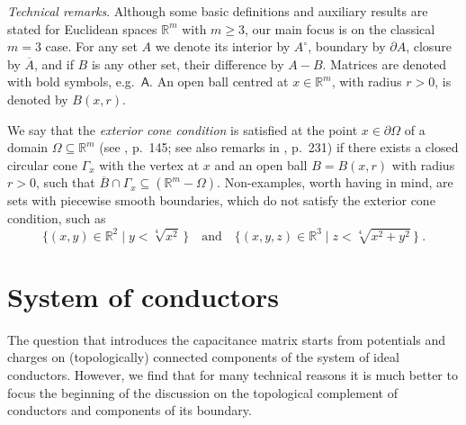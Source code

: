 \documentclass[12pt]{iopart}
\newcommand{\dd}{\partial}
\newcommand{\mx}[1]{\bm{\mathsf{#1}}}
\newcommand{\0}{\vct{0}}
\newcommand{\rr}{\mathds{R}}
\newcommand{\cl}[1]{\overline{#1}}
\theoremstyle{plain} \newtheorem{tm}{Theorem}[section]
\theoremstyle{plain} \newtheorem{lm}[tm]{Lemma}
\theoremstyle{definition} \newtheorem{defn}[tm]{Definition}
\begin{document}
\medskip

\emph{Technical remarks}. Although some basic definitions and auxiliary results are stated for Euclidean spaces $\rr^m$ with $m \ge 3$, our main focus is on the classical $m=3$ case. For any set $A$ we denote its interior by $A^\circ$, boundary by $\dd A$, closure by $\cl{A}$, and if $B$ is any other set, their difference by $A - B$. Matrices are denoted with bold symbols, e.g.~$\mx{A}$. An open ball centred at $x \in \rr^m$, with radius $r > 0$, is denoted by $B(x,r)$.

We say that the \emph{exterior cone condition} is satisfied at the point $x \in \dd\Omega$ of a domain $\Omega \subseteq \rr^m$ (see \cite{Salsa}, p.~145; see also remarks in \cite{Simon}, p.~231) if there exists a closed circular cone $\Gamma_x$ with the vertex at $x$ and an open ball $B = B(x,r)$ with radius $r > 0$, such that $\cl{B} \cap \Gamma_x \subseteq (\rr^m - \Omega)$. Non-examples, worth having in mind, are sets with piecewise smooth boundaries, which do not satisfy the exterior cone condition, such as
\begin{equation*}
\big\{ (x,y) \in \rr^2 \mid y < \sqrt[4]{x^2} \, \big\} \quad \textrm{and} \quad \big\{ (x,y,z) \in \rr^3 \mid z < \sqrt[4]{x^2 + y^2} \, \big\} \ .
\end{equation*}

\bigskip







\section{System of conductors} %

The question that introduces the capacitance matrix starts from potentials and charges on (topologically) connected components of the system of ideal conductors. However, we find that for many technical reasons it is much better to focus the beginning of the discussion on the topological complement of conductors and components of its boundary. 

\medskip
\end{document}
